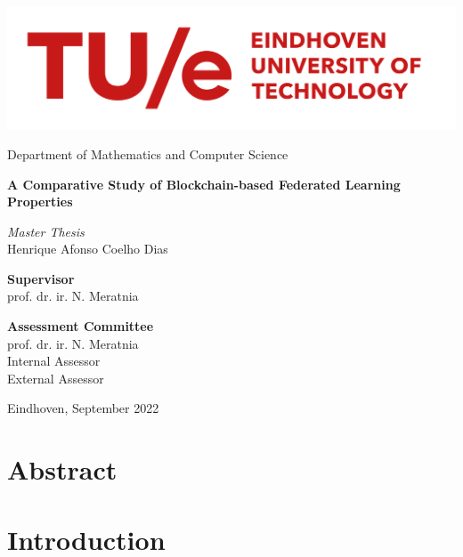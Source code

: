 \documentclass[12pt,a4paper,oneside]{book}
\begin{document}

\begin{titlepage}
\centering
\includegraphics[width=0.7\linewidth]{graphics/tue-logo.png}\par
Department of Mathematics and Computer Science

\vspace{3cm}

{\sffamily\LARGE\textbf{
A Comparative Study of Blockchain-based Federated Learning Properties
}}

\par\vspace{2cm}
{\large\textit{Master Thesis}}\\
\vspace{0.2cm}
{\large Henrique Afonso Coelho Dias}

\vspace{2cm}

\textbf{Supervisor} \\
\vspace{0.1cm}
prof. dr. ir. N. Meratnia

\par

\textbf{Assessment Committee} \\
\vspace{0.1cm}
prof. dr. ir. N. Meratnia \\
Internal Assessor \\
External Assessor \\

\vfill

{Eindhoven, September 2022}

\end{titlepage}

\chapter*{Abstract}\label{chapter:abstract}


\tableofcontents

\listoffigures

\listoftables

\chapter{Introduction}\label{chapter:introduction}

\end{document}
